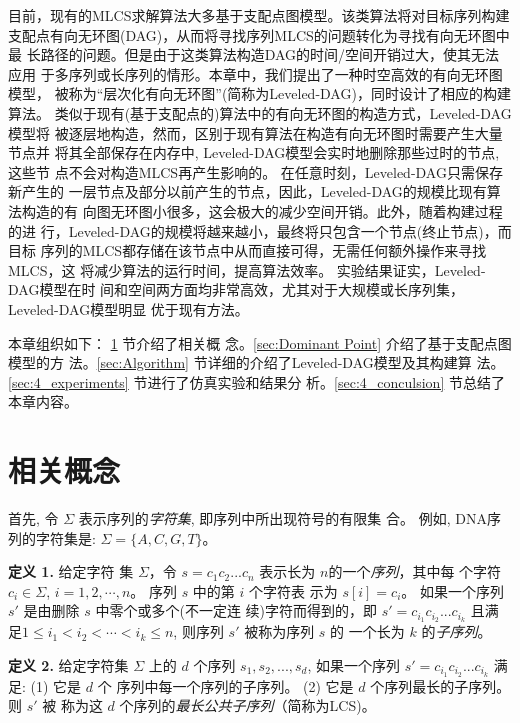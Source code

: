 目前，现有的MLCS求解算法大多基于支配点图模型。该类算法将对目标序列构建
支配点有向无环图(DAG)，从而将寻找序列MLCS的问题转化为寻找有向无环图中最
长路径的问题。但是由于这类算法构造DAG的时间/空间开销过大，使其无法应用
于多序列或长序列的情形。本章中，我们提出了一种时空高效的有向无环图模型，
被称为“层次化有向无环图”(简称为Leveled-DAG)，同时设计了相应的构建算法。
类似于现有(基于支配点的)算法中的有向无环图的构造方式，Leveled-DAG模型将
被逐层地构造，然而，区别于现有算法在构造有向无环图时需要产生大量节点并
将其全部保存在内存中, Leveled-DAG模型会实时地删除那些过时的节点, 这些节
点不会对构造MLCS再产生影响的。 在任意时刻，Leveled-DAG只需保存新产生的
一层节点及部分以前产生的节点，因此，Leveled-DAG的规模比现有算法构造的有
向图无环图小很多，这会极大的减少空间开销。此外，随着构建过程的进
行，Leveled-DAG的规模将越来越小，最终将只包含一个节点(终止节点)，而目标
序列的MLCS都存储在该节点中从而直接可得，无需任何额外操作来寻找MLCS，这
将减少算法的运行时间，提高算法效率。 实验结果证实，Leveled-DAG模型在时
间和空间两方面均非常高效，尤其对于大规模或长序列集，Leveled-DAG模型明显
优于现有方法。

本章组织如下： \ref{sec:4_Notations} 节介绍了相关概
念。\ref{sec:Dominant Point} 介绍了基于支配点图模型的方
法。\ref{sec:Algorithm} 节详细的介绍了Leveled-DAG模型及其构建算
法。\ref{sec:4_experiments} 节进行了仿真实验和结果分
析。\ref{sec:4_conculsion} 节总结了本章内容。

\section{相关概念}
\label{sec:4_Notations}

首先, 令 $\Sigma$ 表示序列的\emph{字符集}, 即序列中所出现符号的有限集
合。 例如, DNA序列的字符集是: $\Sigma=\{A, C, G, T\}$。

\vspace{0.2cm}\textbf{定义 1.} 给定字符
集 $\Sigma$，令 $s=c_1c_2...c_n$ 表示长为 $n$的一个\emph{序列}，其中每
个字符 $c_i\in\Sigma$, $i=1,2,\cdots,n$。 序列 $s$ 中的第 $i$ 个字符表
示为 $s[i]=c_i$。 如果一个序列 $s'$ 是由删除 $s$ 中零个或多个(不一定连
续)字符而得到的，即 $s'=c_{i_1}c_{i_2}...c_{i_k}$
且满足$1 \leq i_1<i_2<\cdots<i_k \leq n$, 则序列 $s'$ 被称为序列 $s$ 的
一个长为 $k$ 的\emph{子序列}。

\textbf{定义 2.} 给定字符集 $\Sigma$ 上的 $d$ 个序列 $s_1, s_2, ...,
s_d$, 如果一个序列 $s'=c_{i_1}c_{i_2}...c_{i_k}$ 满足: (1) 它是 $d$ 个
序列中每一个序列的子序列。 (2) 它是 $d$ 个序列最长的子序列。 则 $s'$ 被
称为这 $d$ 个序列的\emph{最长公共子序列}（简称为LCS)。

